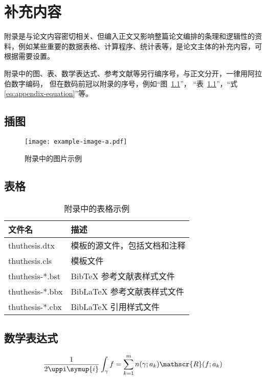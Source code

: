 
\chapter{补充内容}

附录是与论文内容密切相关、但编入正文又影响整篇论文编排的条理和逻辑性的资料，例如某些重要的数据表格、计算程序、统计表等，是论文主体的补充内容，可根据需要设置。

附录中的图、表、数学表达式、参考文献等另行编序号，与正文分开，一律用阿拉伯数字编码，
但在数码前冠以附录的序号，例如“图~\ref{fig:appendix-figure}”，
“表~\ref{tab:appendix-table}”，“式\eqref{eq:appendix-equation}”等。


\section{插图}


\begin{figure}
	\centering
	\texttt{[image: example-image-a.pdf]}
	\caption{附录中的图片示例}
	\label{fig:appendix-figure}
\end{figure}


\section{表格}


\begin{table}
	\centering
	\caption{附录中的表格示例}
	\begin{tabular}{ll}
		\toprule
		文件名          & 描述                         \\
		\midrule
		thuthesis.dtx   & 模板的源文件，包括文档和注释 \\
		thuthesis.cls   & 模板文件                     \\
		thuthesis-*.bst & BibTeX 参考文献表样式文件    \\
		thuthesis-*.bbx & BibLaTeX 参考文献表样式文件  \\
		thuthesis-*.cbx & BibLaTeX 引用样式文件        \\
		\bottomrule
	\end{tabular}
	\label{tab:appendix-table}
\end{table}


\section{数学表达式}

\begin{equation}
	\frac{1}{2 \uppi \symup{i}} \int_\gamma f = \sum_{k=1}^m n(\gamma; a_k) \mathscr{R}(f; a_k)
	\label{eq:appendix-equation}
\end{equation}